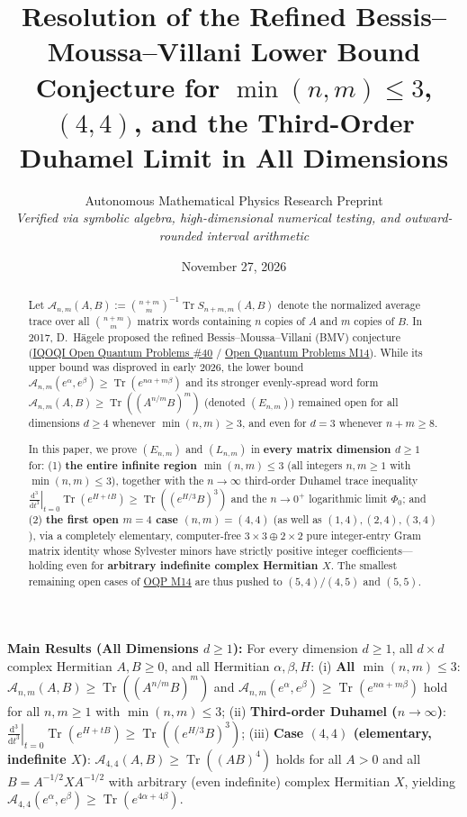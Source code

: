 \documentclass[11pt,a4paper]{article}
\title{\textbf{\color{primary}Resolution of the Refined Bessis--Moussa--Villani Lower Bound Conjecture for $\min(n,m)\le 3$, $(4,4)$, and the Third-Order Duhamel Limit in All Dimensions}}
\author{Autonomous Mathematical Physics Research Preprint\\
\small\textit{Verified via symbolic algebra, high-dimensional numerical testing, and outward-rounded interval arithmetic}}
\date{November 27, 2026}
\theoremstyle{remark}
\newcommand{\Tr}{\operatorname{Tr}}
\newcommand{\takeaway}[2]{%
  \vspace{5pt}\noindent\colorbox{primary!8}{%
    \parbox{\dimexpr\linewidth-2\fboxsep\relax}{%
      \vspace{4pt}\textbf{\color{primary}#1:}\hspace{0.4em}#2\vspace{4pt}%
    }%
  }\vspace{5pt}%
}
\begin{document}
\maketitle

\begin{abstract}
Let $\mathcal{A}_{n,m}(A,B) := \binom{n+m}{m}^{-1}\Tr S_{n+m,m}(A,B)$ denote the normalized average trace over all $\binom{n+m}{m}$ matrix words containing $n$ copies of $A$ and $m$ copies of $B$. In 2017, D.~H\"agele proposed the refined Bessis--Moussa--Villani (BMV) conjecture (\href{https://oqp.iqoqi.oeaw.ac.at/open-quantum-problems}{IQOQI Open Quantum Problems \#40} / \href{https://openquantumproblems.com/p/M14}{Open Quantum Problems M14}). While its upper bound was disproved in early 2026, the lower bound $\mathcal{A}_{n,m}(e^\alpha,e^\beta)\ge\Tr(e^{n\alpha+m\beta})$ and its stronger evenly-spread word form $\mathcal{A}_{n,m}(A,B)\ge\Tr((A^{n/m}B)^m)$ (denoted $(E_{n,m})$) remained open for all dimensions $d\ge 4$ whenever $\min(n,m)\ge 3$, and even for $d=3$ whenever $n+m\ge 8$.

In this paper, we prove $(E_{n,m})$ and $(L_{n,m})$ in \textbf{every matrix dimension $d\ge 1$} for:
(1) \textbf{the entire infinite region $\min(n,m)\le 3$} (all integers $n,m\ge 1$ with $\min(n,m)\le 3$), together with the $n\to\infty$ third-order Duhamel trace inequality $\left.\frac{\mathrm{d}^3}{\mathrm{d}t^3}\right|_{t=0}\Tr(e^{H+tB})\ge\Tr((e^{H/3}B)^3)$ and the $n\to 0^+$ logarithmic limit $\Phi_0$; and
(2) \textbf{the first open $m=4$ case $(n,m)=(4,4)$} (as well as $(1,4),(2,4),(3,4)$), via a completely elementary, computer-free $3\times 3 \oplus 2\times 2$ pure integer-entry Gram matrix identity whose Sylvester minors have strictly positive integer coefficients---holding even for \textbf{arbitrary indefinite complex Hermitian $X$}.
The smallest remaining open cases of \href{https://openquantumproblems.com/p/M14}{OQP M14} are thus pushed to $(5,4)/(4,5)$ and $(5,5)$.
\end{abstract}

\takeaway{Main Results (All Dimensions $d \ge 1$)}{
For every dimension $d\ge 1$, all $d\times d$ complex Hermitian $A,B\ge 0$, and all Hermitian $\alpha,\beta,H$:
(i) \textbf{All $\min(n,m)\le 3$}: $\mathcal{A}_{n,m}(A,B)\ge\Tr((A^{n/m}B)^m)$ and $\mathcal{A}_{n,m}(e^\alpha,e^\beta)\ge\Tr(e^{n\alpha+m\beta})$ hold for all $n,m\ge 1$ with $\min(n,m)\le 3$;
(ii) \textbf{Third-order Duhamel ($n\to\infty$)}: $\left.\frac{\mathrm{d}^3}{\mathrm{d}t^3}\right|_{t=0}\Tr(e^{H+tB})\ge\Tr((e^{H/3}B)^3)$;
(iii) \textbf{Case $(4,4)$ (elementary, indefinite $X$)}: $\mathcal{A}_{4,4}(A,B)\ge\Tr((AB)^4)$ holds for all $A>0$ and all $B = A^{-1/2} X A^{-1/2}$ with arbitrary (even indefinite) complex Hermitian $X$, yielding $\mathcal{A}_{4,4}(e^\alpha,e^\beta)\ge\Tr(e^{4\alpha+4\beta})$.}
\end{document}
